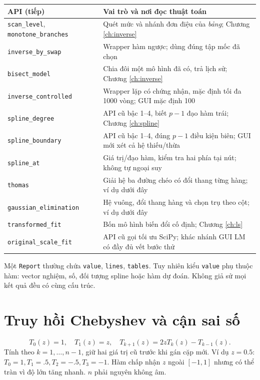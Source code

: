 \begin{center}\small\begin{tabular}{@{}p{}p{}@{}}\toprule
API (tiếp) & Vai trò và nơi đọc thuật toán\\\midrule
\texttt{scan\_level}, \texttt{monotone\_branches} & Quét mức và nhánh đơn điệu của \emph{bảng}; Chương \ref{ch:inverse}\\
\texttt{inverse\_by\_swap} & Wrapper hàm ngược; dùng đúng tập mốc đã chọn\\
\texttt{bisect\_model} & Chia đôi một mô hình đã có, trả lịch sử; Chương \ref{ch:inverse}\\
\texttt{inverse\_controlled} & Wrapper lặp có chứng nhận, mặc định tối đa 1000 vòng; GUI mặc định 100\\
\texttt{spline\_degree} & API cũ bậc 1--4, biết $p-1$ đạo hàm trái; Chương \ref{ch:spline}\\
\texttt{spline\_boundary} & API cũ bậc 1--4, đúng $p-1$ điều kiện biên; GUI mới xét cả hệ thiếu/thừa\\
\texttt{spline\_at} & Giá trị/đạo hàm, kiểm tra hai phía tại nút; không tự ngoại suy\\
\texttt{thomas} & Giải hệ ba đường chéo có đổi thang từng hàng; ví dụ dưới đây\\
\texttt{gaussian\_elimination} & Hệ vuông, đổi thang hàng và chọn trụ theo cột; ví dụ dưới đây\\
\texttt{transformed\_fit} & Bốn mô hình biến đổi cố định; Chương \ref{ch:ls}\\
\texttt{original\_scale\_fit} & API cũ gọi tối ưu SciPy; khác nhánh GUI LM có đầy đủ vết bước thử\\\bottomrule
\end{tabular}\end{center}

Một \texttt{Report} thường chứa \texttt{value}, \texttt{lines}, \texttt{tables}. Tuy nhiên kiểu \texttt{value} phụ thuộc hàm: vector nghiệm, số, đối tượng spline hoặc hàm dự đoán. Không giả sử mọi kết quả đều có cùng cấu trúc.

\section{Truy hồi Chebyshev và cận sai số}
\[
 T_0(z)=1,\quad T_1(z)=z,\quad
 T_{k+1}(z)=2zT_k(z)-T_{k-1}(z).
\]
Tính theo $k=1,\ldots,n-1$, giữ hai giá trị cũ trước khi gán cặp mới. Ví dụ $z=0.5$: $T_0=1,T_1=.5,T_2=-.5,T_3=-1$. Hàm chấp nhận $z$ ngoài $[-1,1]$ nhưng có thể tràn vì độ lớn tăng nhanh. $n$ phải nguyên không âm.

